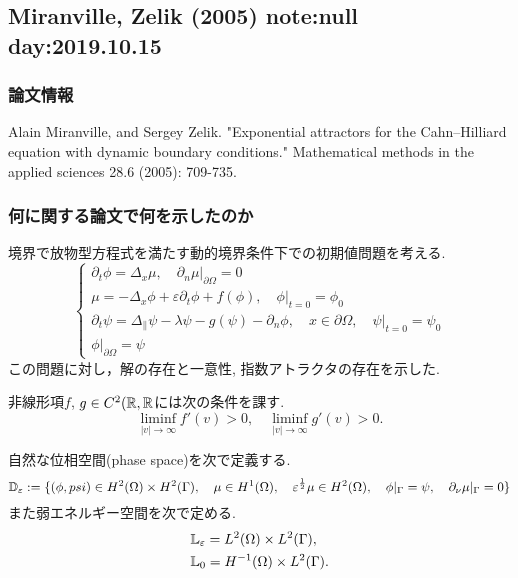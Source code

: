\documentclass[openary, a4paper, oneside]{jsarticle}
\begin{document}
\newpage

\subsection{Miranville, Zelik (2005) \cite{MiranvilleZelik2005} note:null  day:2019.10.15}
	\subsubsection{論文情報}
		Alain Miranville, and Sergey Zelik. "Exponential attractors for the Cahn–Hilliard equation with dynamic boundary conditions." Mathematical methods in the applied sciences 28.6 (2005): 709-735.
	\subsubsection{何に関する論文で何を示したのか}
		境界で放物型方程式を満たす動的境界条件下での初期値問題を考える.
		\begin{equation}\left\{\begin{array}{l}
			{\partial_{t} \phi=\Delta_{x} \mu,\left.\quad \partial_{n} \mu\right|_{\partial \Omega}=0} \\ {\mu=-\Delta_{x} \phi+\varepsilon \partial_{t} \phi+f(\phi),\left.\quad \phi\right|_{t=0}=\phi_{0}} \\ {\partial_{t} \psi=\Delta_{\|} \psi-\lambda \psi-g(\psi)-\partial_{n} \phi, \quad x \in \partial \Omega,\left.\quad \psi\right|_{t=0}=\psi_{0}} \\ {\left.\phi\right|_{\partial \Omega}=\psi}
		\end{array}\right.\end{equation}
		この問題に対し，解の存在と一意性, 指数アトラクタの存在を示した.

		非線形項$f$, $g\in C^2(\mathbb{R},\mathbb{R}$には次の条件を課す.
		\begin{equation}
			\liminf_{|v|\to\infty}f'(v)>0,\quad \liminf_{|v|\to\infty}g'(v)>0.
		\end{equation}

		自然な位相空間(phase space)を次で定義する.
		\begin{equation}
			\mathbb{D}_{\varepsilon} := \{(\phi,psi)\in H^2(\Omega)\times H^2(\Gamma),\quad \mu\in H^1(\Omega),\quad \varepsilon^{\frac{1}{2}}\mu\in H^2(\Omega),\quad \phi|_{\Gamma}=\psi,\quad \partial_{\nu}\mu|_{\Gamma}=0\}
		\end{equation}
		また弱エネルギー空間を次で定める.
		\begin{align}
			&\mathbb{L}_{\varepsilon} = L^2(\Omega)\times L^2(\Gamma),\\
			&\mathbb{L}_0 = H^{-1}(\Omega)\times L^2(\Gamma).
		\end{align}
\end{document}
